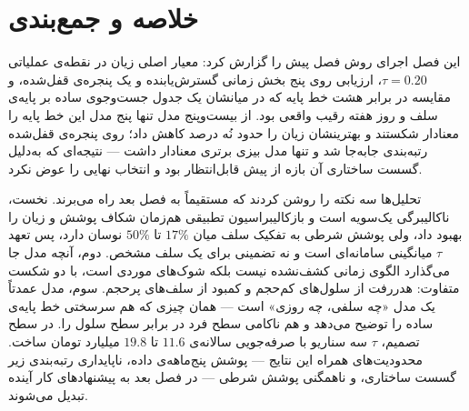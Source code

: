 \section{خلاصه و جمع‌بندی}
\label{sec:4-7}

این فصل اجرای روش فصل پیش را گزارش کرد: معیار اصلی زیان  در نقطه‌ی عملیاتی
$\tau = 0.20$، ارزیابی روی پنج بخش زمانی گسترش‌یابنده و یک پنجره‌ی قفل‌شده، و مقایسه در
برابر هشت خط پایه که در میانشان یک جدول جست‌وجوی ساده بر پایه‌ی سلف و روز هفته رقیب
واقعی بود. از بیست‌وپنج مدل تنها پنج مدل این خط پایه را معنادار شکستند و بهترینشان زیان
را حدود نُه درصد کاهش داد؛ روی پنجره‌ی قفل‌شده رتبه‌بندی جابه‌جا شد و تنها مدل بیزی برتری
معنادار داشت — نتیجه‌ای که به‌دلیل گسست ساختاری آن بازه از پیش قابل‌انتظار بود و انتخاب
نهایی را عوض نکرد.

تحلیل‌ها سه نکته را روشن کردند که مستقیماً به فصل بعد راه می‌برند. نخست، ناکالیبرگی
یک‌سویه است و بازکالیبراسیون تطبیقی هم‌زمان شکاف پوشش و زیان را بهبود داد، ولی پوشش
شرطی به تفکیک سلف میان $17\%$ تا $50\%$ نوسان دارد، پس تعهد $\tau$ میانگینی سامانه‌ای
است و نه تضمینی برای یک سلف مشخص. دوم، آنچه مدل جا می‌گذارد الگوی زمانی کشف‌نشده نیست
بلکه شوک‌های موردی است، با دو شکست متفاوت: هدررفت از سلول‌های کم‌حجم و کمبود از سلف‌های
پرحجم. سوم، مدل عمدتاً یک مدل «چه سلفی، چه روزی» است — همان چیزی که هم سرسختی خط پایه‌ی
ساده را توضیح می‌دهد و هم ناکامی سطح فرد در برابر سطح سلول را. در سطح تصمیم، $\tau$ سه
سناریو با صرفه‌جویی سالانه‌ی $11.6$ تا $19.8$ میلیارد تومان ساخت. محدودیت‌های همراه این
نتایج — پوشش پنج‌ماهه‌ی داده، ناپایداری رتبه‌بندی زیر گسست ساختاری، و ناهمگنی پوشش
شرطی — در فصل بعد به پیشنهادهای کار آینده تبدیل می‌شوند.
